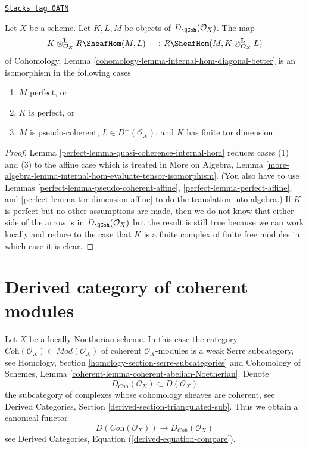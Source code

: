 \begin{lemma}
\label{perfect-lemma-internal-hom-evaluate-tensor-isomorphism}
\href{https://stacks.math.columbia.edu/tag/0ATN}{\texttt{Stacks tag 0ATN}}

Let $X$ be a scheme. Let $K, L, M$ be objects of $D_\QCoh(\mathcal{O}_X)$.
The map
$$
K \otimes_{\mathcal{O}_X}^\mathbf{L} R\SheafHom(M, L)
\longrightarrow
R\SheafHom(M, K \otimes_{\mathcal{O}_X}^\mathbf{L} L)
$$
of Cohomology, Lemma \ref{cohomology-lemma-internal-hom-diagonal-better}
is an isomorphism in the following cases
\begin{enumerate}
\item $M$ perfect, or
\item $K$ is perfect, or
\item $M$ is pseudo-coherent, $L \in D^+(\mathcal{O}_X)$, and $K$ has finite
tor dimension.
\end{enumerate}
\end{lemma}

\begin{proof}

Lemma \ref{perfect-lemma-quasi-coherence-internal-hom}
reduces cases (1) and (3) to the affine case which is treated in
More on Algebra, Lemma
\ref{more-algebra-lemma-internal-hom-evaluate-tensor-isomorphism}.
(You also have to use Lemmas \ref{perfect-lemma-pseudo-coherent-affine},
\ref{perfect-lemma-perfect-affine}, and \ref{perfect-lemma-tor-dimension-affine}
to do the translation into algebra.)
If $K$ is perfect but no other assumptions are made, then we
do not know that either side of the arrow is in $D_\QCoh(\mathcal{O}_X)$
but the result is still true because we can work locally and reduce
to the case that $K$ is a finite complex of finite free modules
in which case it is clear.
\end{proof}

\section{Derived category of coherent modules}
\label{perfect-section-derived-coherent}
Let $X$ be a locally Noetherian scheme. In this case the category
$\textit{Coh}(\mathcal{O}_X) \subset \textit{Mod}(\mathcal{O}_X)$
of coherent $\mathcal{O}_X$-modules is a weak Serre subcategory, see
Homology, Section \ref{homology-section-serre-subcategories}
and
Cohomology of Schemes, Lemma \ref{coherent-lemma-coherent-abelian-Noetherian}.
Denote
$$
D_{\textit{Coh}}(\mathcal{O}_X) \subset D(\mathcal{O}_X)
$$
the subcategory of complexes whose cohomology sheaves are coherent, see
Derived Categories, Section \ref{derived-section-triangulated-sub}.
Thus we obtain a canonical functor
\begin{equation}
\label{equation-compare-coherent}
D(\textit{Coh}(\mathcal{O}_X))
\longrightarrow
D_{\textit{Coh}}(\mathcal{O}_X)
\end{equation}
see Derived Categories, Equation (\ref{derived-equation-compare}).

